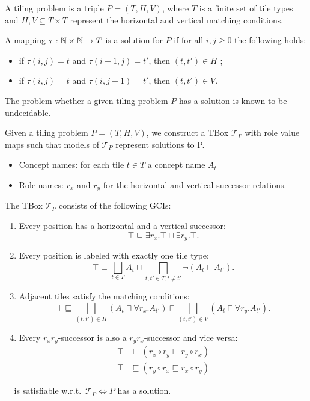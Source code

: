\begin{definition}
	A tiling problem is a triple $P= (T, H, V)$, where $T$ is a finite set of tile types
	and $H, V \subseteq T \times T$ represent the horizontal and vertical matching conditions.

	A mapping $\tau: \mathbb{N} \times \mathbb{N} \to T$ is a solution for $P$ if for all $i, j \geq 0$ the following holds:
	\begin{itemize}
		\item if $\tau(i,j) = t$ and $\tau(i+1,j) = t'$, then $(t,t') \in H$ ;
		\item if $\tau(i,j) = t$ and $\tau(i,j+1) = t'$, then $(t,t') \in V$.
	\end{itemize}

	The problem whether a given tiling problem $P$ has a solution is known to be undecidable.
\end{definition}
Given a tiling problem $P = (T, H, V)$, we construct a TBox $\mathcal{T}_P$ with role value maps
such that models of $\mathcal{T}_P$ represent solutions to P.
\begin{itemize}
	\item Concept names: for each tile $t \in T$ a concept name $A_t$ 
	\item Role names: $r_x$ and $r_y$ for the horizontal and vertical successor relations.
\end{itemize}
The TBox $\mathcal{T}_P$ consists of the following GCIs:
\begin{enumerate}[label=(\roman*)]
	\item Every position has a horizontal and a vertical successor:
		\[
			\top \sqsubseteq  \exists r_x .\top \sqcap \exists r_y. \top
		.\]
	\item Every position is labeled with exactly one tile type:
		\[
			\top \sqsubseteq \bigsqcup_{t \in T} A_t \sqcap \bigsqcap_{t,t' \in T, t \neq t'} \neg (A_t \sqcap A_{t'})
		.\]
	\item Adjacent tiles satisfy the matching conditions:
		\[
			\top \sqsubseteq \bigsqcup_{(t,t') \in H} (A_t \sqcap \forall r_x.A_{t'}) \sqcap \bigsqcup_{(t,t') \in V} (A_t \sqcap \forall r_y.A_{t'})
		.\]
	\item Every $r_x r_y$-successor is also a $r_y r_x$-successor and vice versa:
		\begin{align*}
			\top &\sqsubseteq (r_x \circ r_y \sqsubseteq r_y \circ r_x) \\
			\top &\sqsubseteq (r_y \circ r_x \sqsubseteq r_x \circ r_y)
		\end{align*}
\end{enumerate}
\newpage
\begin{lemma}
	$\top$ is satisfiable w.r.t.\ $\mathcal{T}_P \iff P$  has a solution.
\end{lemma}
